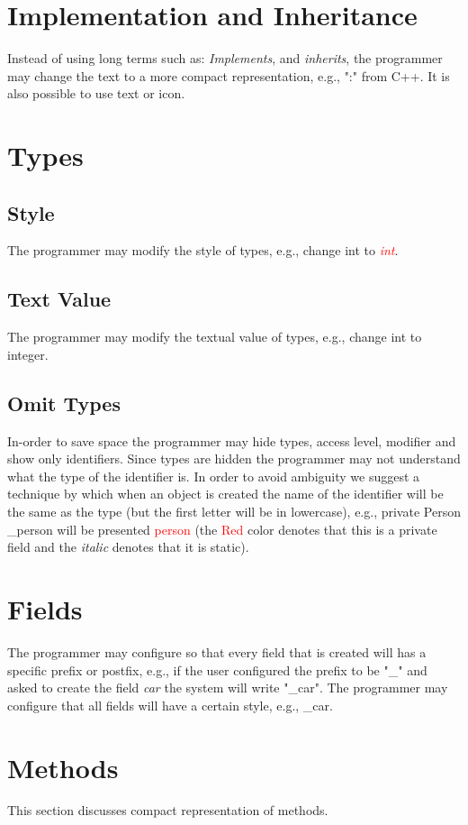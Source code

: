 \section{Implementation and Inheritance}
Instead of using long terms such as: \textit{Implements}, and \textit{inherits}, the programmer may change the text to a more compact representation, e.g., ":" from C++. It is also possible to use text or icon.
\section{Types}
\subsection{Style}
The programmer may modify the style of types, e.g., change int to \textit{\textcolor{red}{int}}.
\subsection{Text Value}
The programmer may modify the textual value of types, e.g., change int to integer.
\subsection{Omit Types}
In-order to save space the programmer may hide types, access level, modifier and show only identifiers. Since types are hidden the programmer may not understand what the type of the identifier is. In order to avoid ambiguity we suggest a technique by which when an object is created the name of the identifier will be the same as the type (but the first letter will be in lowercase), e.g., private Person \_person will be presented \textcolor{red}{person} (the \textcolor{red}{Red} color denotes that this is a private field and the \textit{italic} denotes that it is static).
\section{Fields}
The programmer may configure so that every field that is created will has a specific prefix or postfix, e.g., if the user configured the prefix to be "\_" and asked to create the field \textit{car} the system will write "\_car". The programmer may configure that all fields will have a certain style, e.g., \_car.
\section{Methods}
This section discusses compact representation of methods.

